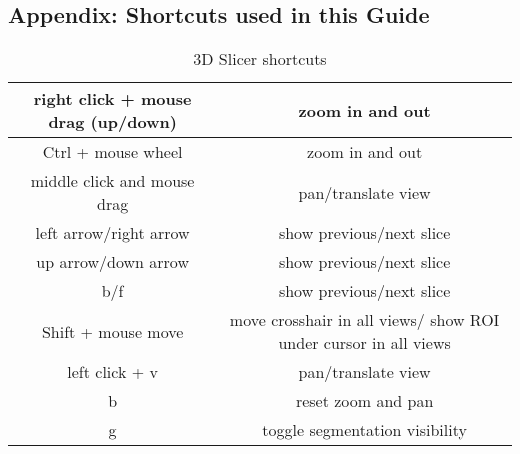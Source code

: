 \begin{appendix}
	\section{Appendix: Shortcuts used in this Guide}
	\begin{table}[!h]
		\begin{center}
			\caption{3D Slicer shortcuts}
			\label{table:shortcuts}
			\begin{tabular}{ |c|c| }
				\hline
				right click + mouse drag (up/down) & zoom in and out                                                 \\
				\hline
				Ctrl + mouse wheel                 & zoom in and out                                                 \\
				\hline
				middle click and mouse drag        & pan/translate view                                              \\
				\hline
				left arrow/right arrow             & show previous/next slice                                        \\
				\hline
				up arrow/down arrow                & show previous/next slice                                        \\
				\hline
				b/f                                & show previous/next slice                                        \\
				\hline
				Shift + mouse move                 & move crosshair in all views/ show ROI under cursor in all views \\
				\hline
				left click + v                     & pan/translate view                                              \\
				\hline
				b                                  & reset zoom and pan                                              \\
				\hline
				g                                  & toggle segmentation visibility                                  \\
				\hline
			\end{tabular}
		\end{center}
	\end{table}
\end{appendix}
